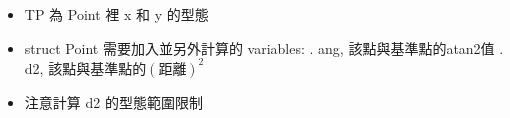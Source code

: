 \begin{itemize}
    \item TP 為 Point 裡 x 和 y 的型態
    \item struct Point 需要加入並另外計算的 variables:
        . ang, 該點與基準點的atan2值
        . d2, 該點與基準點的$(距離)^2$
    \item 注意計算 d2 的型態範圍限制 
\end{itemize}